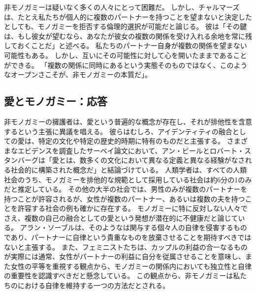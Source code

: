 \documentclass[paper=a4,book,openany]{jlreq}
\begin{document}
非モノガミーは疑いなく多くの人々にとって困難だ。
しかし、チャルマーズは、たとえ私たちが個人的に複数のパートナーを持つことを望まないと決定したとしても、モノガミーを拒否する倫理的選択が可能だと論じる。
彼は「その鍵は、もし彼女が望むなら、あなたが彼女の複数の関係を受け入れる余地を常に残しておくことだ」と述べる\citep[p.241]{chalmers19:_is_monog_moral_permis}。
私たちのパートナー自身が複数の関係を望まない可能性もある。
しかし、互いにその可能性に対して心を開いたままであることができる。
「複数の関係に同時にあるという実態そのものではなく、このようなオープンさこそが、非モノガミーの本質だ」\citep[p.241]{chalmers19:_is_monog_moral_permis}。

\subsection{愛とモノガミー：応答}

非モノガミーの擁護者は、愛という普遍的な概念が存在し、それが排他性を含意するという主張に異議を唱える。
彼らはむしろ、アイデンティティの融合としての愛は、特定の文化や特定の歴史的時期に特有のものだと主張する。
さまざまなエビデンスを調査したサーベイ論文において、アン・ビールとロバート・スタンバーグは「愛とは、数多くの文化において異なる定義と異なる経験がなされる社会的に構築された概念だ」と結論づけている\citep[p.433]{beall95:_social_const_love}。
人類学者は、すべての人類社会のうち、モノガミーを排他的な規範として採用している社会は約6分の1のみだと推定している。
その他の大半の社会では、男性のみが複数のパートナーを持つことが許容されるが、女性が複数のパートナー、あるいは複数の夫を持つことを許容する社会の例も確かに存在する。
モノガミーに特に反対しない人々でさえ、複数の自己の融合としての愛という発想が潜在的に不健康だと論じている。
アラン・ソーブルは、そのようなは関与する個々人の自律を侵害するものであり、パートナーに自律という貴重なものを放棄させることを期待すべきではないと主張する\citep{soble97:_union_auton_concer}。
また、フェミニストたちは、カップルの利益の合一なるものが実際には通常、女性がパートナーの利益に自分を従属させることを意味し、また女性の平等を重視する観点から、モノガミーの関係内においても独立性と自律の重要性を認識すべきだと懸念している\citep{friedman98:_roman_love_person_auton}。
この観点から、非モノガミーは私たちのにおける自律を維持する一つの方法だとされる。
\end{document}

